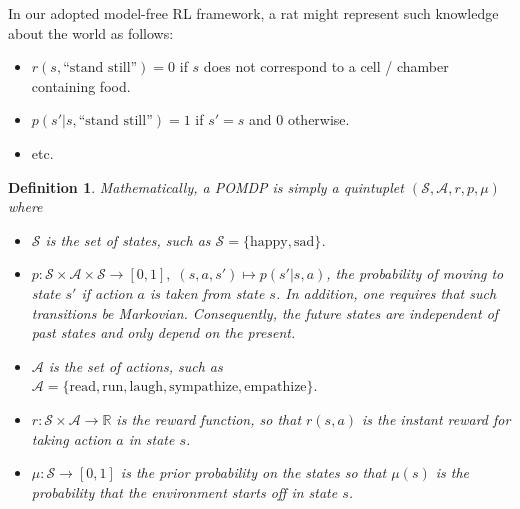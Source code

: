 \documentclass[10pt,letterpaper]{article}
\newtheorem*{definition*}{Definition}
\newtheorem{remark}{Remark}
\begin{document}
In our adopted model-free RL framework,
a rat might represent such knowledge about the world as follows:
\begin{itemize}
\item $r(s, \text{``stand still''}) = 0$ if $s$ does not correspond to a cell / chamber containing food.
\item $p(s'|s,\text{``stand still''}) = 1$ if $s'=s$ and $0$ otherwise.
\item etc.
\end{itemize}

\begin{mdframed}
\begin{definition*}
Mathematically, a POMDP is simply a quintuplet $(\mathcal S, \mathcal A, r, p, \mu)$ where
\begin{itemize}
\item $\mathcal S$ is the set of states, such as $\mathcal S = \{\text{happy}, \text{sad}\}$.
\item $p : \mathcal S \times \mathcal A \times \mathcal S \rightarrow [0, 1],\; (s,a,s') \mapsto p(s'|s,a)$,
  the probability of moving to state $s'$ if action $a$ is taken from state $s$. In addition, one requires that such
  transitions be Markovian. Consequently, the future states are independent of past states and only depend on the present.
\item $\mathcal A$ is the set of actions, such as $\mathcal A = \{\text{read}, \text{run},
  \text{laugh}, \text{sympathize}, \text{empathize}\}.$
\item $r : \mathcal S \times \mathcal A \rightarrow \mathbb R$ is the \textit{reward function},
  so that $r(s, a)$ is the instant reward for taking action $a$ in state $s$.
\item $\mu: \mathcal S \rightarrow [0, 1]$ is the prior probability on the states so that
  $\mu(s)$ is the probability that the environment starts off in state $s$.
\end{itemize}

\end{definition*}
\end{mdframed}
\end{document}

